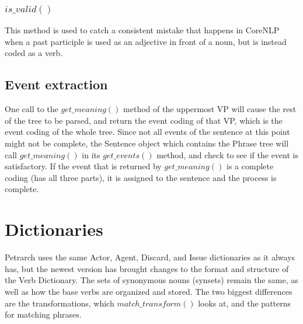 \documentclass[11pt]{article}
\begin{document}
\subsubsection{$is\_valid()$}
This method is used to catch a consistent mistake that happens in CoreNLP when a 
past participle is used as an adjective in front of a noun, but is instead coded 
as a verb. 

\subsection{Event extraction}
One call to the $get\_meaning()$ method of the uppermost VP will cause the rest 
of the tree to be parsed, and return the event coding of that VP, which is the 
event coding of the whole tree. Since not all events of the sentence at this 
point might not be complete, the Sentence object which contains the Phrase tree
will call $get\_meaning()$ in its $get\_events()$ method, and check to see if 
the event is satisfactory. If the event that is
returned by $get\_meaning()$ is a complete coding (has all three parts), it is assigned to the 
sentence and the process is complete.

\section{Dictionaries}
Petrarch uses the same Actor, Agent, Discard, and Issue dictionaries as it 
always has, but the newest version has brought changes to the format and 
structure of the Verb Dictionary. The sets of synonymous nouns (synsets) remain 
the same, as well as how the base verbs are organized and stored. The two 
biggest differences are the transformations, which $match\_transform()$ looks at,
and the patterns for matching phrases. 
\end{document}
